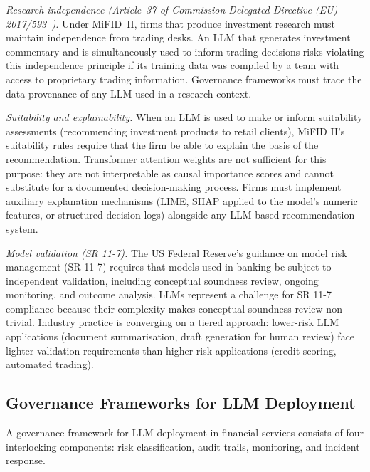 \begin{context}
\emph{Research independence (Article~37 of Commission Delegated Directive (EU) 2017/593~\citep{esma2018mifid2}).}  Under MiFID~II, firms that produce
investment research must maintain independence from trading desks.  An LLM that
generates investment commentary and is simultaneously used to inform trading
decisions risks violating this independence principle if its training data
was compiled by a team with access to proprietary trading information.
Governance frameworks must trace the data provenance of any LLM used in a
research context.

\emph{Suitability and explainability.}  When an LLM is used to make or inform
suitability assessments (recommending investment products to retail clients),
MiFID II's suitability rules require that the firm be able to explain the
basis of the recommendation.  Transformer attention weights are not sufficient
for this purpose: they are not interpretable as causal importance scores and
cannot substitute for a documented decision-making process.  Firms must
implement auxiliary explanation mechanisms (LIME, SHAP applied to the model's
numeric features, or structured decision logs) alongside any LLM-based
recommendation system.

\emph{Model validation (SR 11-7).}  The US Federal Reserve's guidance on model
risk management (SR 11-7) requires that models used in banking be subject to
independent validation, including conceptual soundness review, ongoing monitoring,
and outcome analysis.  LLMs represent a challenge for SR 11-7 compliance
because their complexity makes conceptual soundness review non-trivial.
Industry practice is converging on a tiered approach: lower-risk LLM applications
(document summarisation, draft generation for human review) face lighter
validation requirements than higher-risk applications (credit scoring, automated
trading).

\subsection{Governance Frameworks for LLM Deployment}
\label{subsec:governance}

A governance framework for LLM deployment in financial services consists of
four interlocking components: risk classification, audit trails, monitoring,
and incident response.


\end{context}
